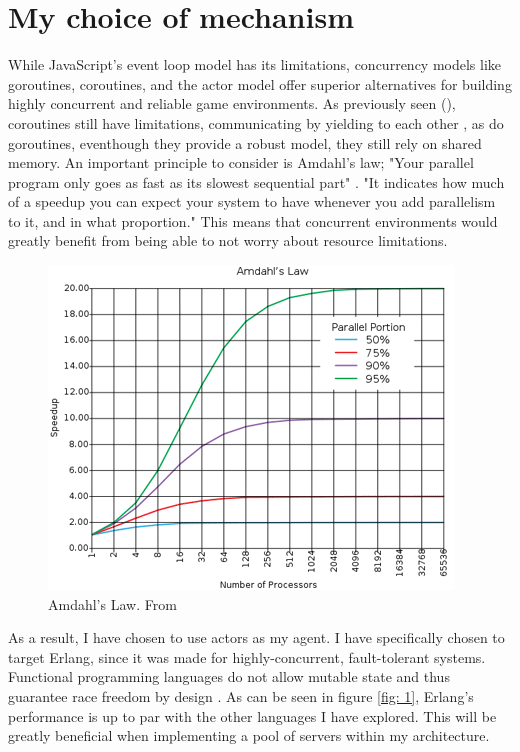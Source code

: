 \documentclass[]{final}
\begin{document}
\section{My choice of mechanism}
While JavaScript’s event loop model has its limitations, concurrency
models like goroutines, coroutines, and the actor model offer superior
alternatives for building highly concurrent and reliable game environments.
As previously seen {\hypersetup{linkcolor=teal}(\pageref{coroutines})}, coroutines still have limitations, communicating by yielding
to each other \cite{noauthor_introconcurrency_nodate}, as do goroutines,
eventhough they provide a robust model, they still rely on shared memory.
An important principle to consider is Amdahl's law; "Your parallel program only goes as fast as its slowest sequential part" \cite{yang_c_nodate}.
"It indicates how much of a speedup you can expect your system to have whenever
you add parallelism to it, and in what proportion." \cite{yang_c_nodate}
This means that concurrent environments would greatly benefit from being able to
not worry about resource limitations.
\begin{figure}[ht!]
  \centering
  \includegraphics[width=0.7\linewidth]{amdahl}
  \vspace*{-0.3cm}
  \caption{Amdahl's Law. From \cite{noauthor_hitchhikers_nodate}}
  \label{fig: 0}
\end{figure}

\newpage

As a result, I have chosen to use actors as my agent. I have specifically
chosen to target Erlang, since it was made for highly-concurrent, fault-tolerant
systems. Functional programming languages do not allow mutable state and thus
guarantee race freedom by design \cite{bianchi_survey_2018}.
As can be seen in figure \ref{fig: 1}, Erlang's performance is up to par with the
other languages I have explored. This will be greatly beneficial when implementing
a pool of servers within my architecture.
\end{document}
